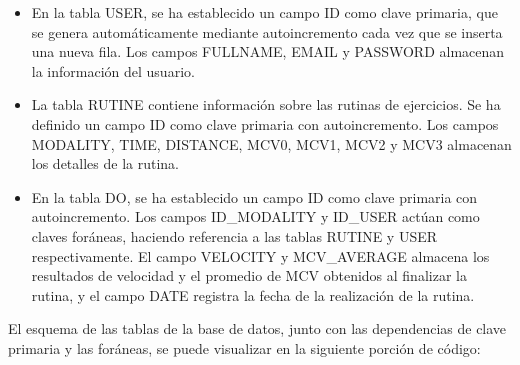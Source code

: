 \begin{itemize}
    \item En la tabla USER, se ha establecido un campo ID como clave primaria, que se genera automáticamente mediante autoincremento cada vez que se inserta una nueva fila. Los campos FULLNAME, EMAIL y PASSWORD almacenan la información del usuario.

    \item La tabla RUTINE contiene información sobre las rutinas de ejercicios. Se ha definido un campo ID como clave primaria con autoincremento. Los campos MODALITY, TIME, DISTANCE, MCV0, MCV1, MCV2 y MCV3 almacenan los detalles de la rutina.

    \item En la tabla DO, se ha establecido un campo ID como clave primaria con autoincremento. Los campos ID\_MODALITY y ID\_USER actúan como claves foráneas, haciendo referencia a las tablas RUTINE y USER respectivamente. El campo VELOCITY y MCV\_AVERAGE almacena los resultados de velocidad y el promedio de MCV obtenidos al finalizar la rutina, y el campo DATE registra la fecha de la realización de la rutina.
\end{itemize}

El esquema de las tablas de la base de datos, junto con las dependencias de clave primaria y las foráneas, se puede visualizar en la siguiente 
porción de código:

